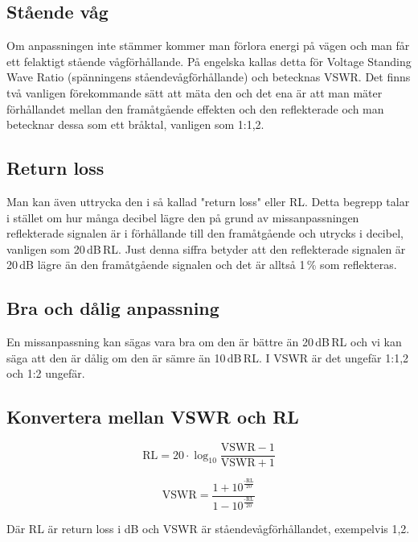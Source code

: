 \subsection{Stående våg}

Om anpassningen inte stämmer kommer man förlora energi på vägen och man får
ett felaktigt stående vågförhållande. På engelska kallas detta för Voltage
Standing Wave Ratio (spänningens ståendevågförhållande) och betecknas VSWR.
Det finns två vanligen förekommande sätt att mäta den och det ena är att man
mäter förhållandet mellan den framåtgående effekten och den reflekterade och
man betecknar dessa som ett bråktal, vanligen som 1:1,2.

\subsection{Return loss}

Man kan även uttrycka den i så kallad "return loss" eller RL. Detta begrepp
talar i stället om hur många decibel lägre den på grund av missanpassningen
reflekterade signalen är i förhållande till den framåtgående och utrycks i
decibel, vanligen som 20\,dB\,RL. Just denna siffra betyder att den
reflekterade signalen är 20\,dB lägre än den framåtgående signalen och det är
alltså 1\,\% som reflekteras.

\subsection{Bra och dålig anpassning}

En missanpassning kan sägas vara bra om den är bättre än 20\,dB\,RL och vi kan
säga att den är dålig om den är sämre än 10\,dB\,RL. I VSWR är det ungefär
1:1,2 och 1:2 ungefär.

\subsection{Konvertera mellan VSWR och RL}

\begin{equation}
	\text{RL} = 20 \cdot \log_{10} \frac{\text{VSWR}-1}{\text{VSWR}+1}
\end{equation}

\begin{equation}
	\text{VSWR} = \frac{1+10^\frac{\text{-RL}}{20}}{1-10^\frac{\text{-RL}}{20}}
\end{equation}

Där RL är return loss i dB och VSWR är ståendevågförhållandet, exempelvis 1,2.

